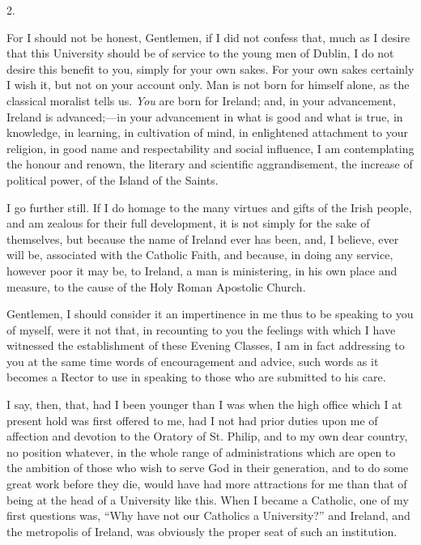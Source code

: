 2.

For I should not be honest, Gentlemen, if I did not confess that,
much as I desire that this University should be of service to the
young men of Dublin, I do not desire this benefit to you, simply for
your own sakes. For your own sakes certainly I wish it, but not on
your account only. Man is not born for himself alone, as the
classical moralist tells us. \emph{You} are born for Ireland; and, in
your advancement, Ireland is advanced;—in your advancement in what
is good and what is true, in knowledge, in learning, in cultivation of
mind, in enlightened attachment to your religion, in good name and
respectability and social influence, I am contemplating the honour and
renown, the literary and scientific aggrandisement, the increase of
political power, of the Island of the Saints.

I go further still. If I do homage to the many virtues and gifts of
the Irish people, and am zealous for their full development, it is not
simply for the sake of themselves, but because the name of Ireland
ever has been, and, I believe, ever will be, associated with the
Catholic Faith, and because, in doing any service, however poor it may
be, to Ireland, a man is ministering, in his own place and measure, to
the cause of the Holy Roman Apostolic Church.

Gentlemen, I should consider it an impertinence in me thus to be
speaking to you of myself, were it not that, in recounting to you the
feelings with which I have witnessed the establishment of these
Evening Classes, I am in fact addressing to you at the same time words
of encouragement and advice, such words as it becomes a Rector to use
in speaking to those who are submitted to his care.

I say, then, that, had I been younger than I was when the high
office which I at present hold was first offered to me, had I not had
prior duties upon me of affection and devotion to the Oratory of St.
Philip, and to my own dear country, no position whatever, in the whole
range of administrations which are open to the ambition of those who
wish to serve God in their generation, and to do some great work
before they die, would have had more attractions for me than that of
being at the head of a University like this. When I became a Catholic,
one of my first questions was, ``Why have not our Catholics a
University?'' and Ireland, and the metropolis of Ireland, was
obviously the proper seat of such an institution.

